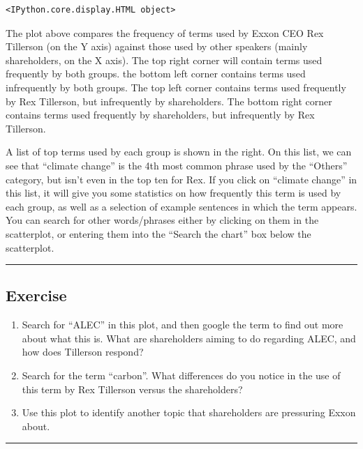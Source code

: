 \documentclass[
  letterpaper,
  DIV=11,
  numbers=noendperiod]{scrreprt}
\begin{document}
\begin{verbatim}
<IPython.core.display.HTML object>
\end{verbatim}

The plot above compares the frequency of terms used by Exxon CEO Rex
Tillerson (on the Y axis) against those used by other speakers (mainly
shareholders, on the X axis). The top right corner will contain terms
used frequently by both groups. the bottom left corner contains terms
used infrequently by both groups. The top left corner contains terms
used frequently by Rex Tillerson, but infrequently by shareholders. The
bottom right corner contains terms used frequently by shareholders, but
infrequently by Rex Tillerson.

A list of top terms used by each group is shown in the right. On this
list, we can see that ``climate change'' is the 4th most common phrase
used by the ``Others'' category, but isn't even in the top ten for Rex.
If you click on ``climate change'' in this list, it will give you some
statistics on how frequently this term is used by each group, as well as
a selection of example sentences in which the term appears. You can
search for other words/phrases either by clicking on them in the
scatterplot, or entering them into the ``Search the chart'' box below
the scatterplot.

\begin{center}\rule{0.5\linewidth}{0.5pt}\end{center}

\hypertarget{exercise-10}{%
\subsection{Exercise}\label{exercise-10}}

\begin{enumerate}
\def\labelenumi{\arabic{enumi}.}
\item
  Search for ``ALEC'' in this plot, and then google the term to find out
  more about what this is. What are shareholders aiming to do regarding
  ALEC, and how does Tillerson respond?
\item
  Search for the term ``carbon''. What differences do you notice in the
  use of this term by Rex Tillerson versus the shareholders?
\item
  Use this plot to identify another topic that shareholders are
  pressuring Exxon about.
\end{enumerate}

\begin{center}\rule{0.5\linewidth}{0.5pt}\end{center}
\end{document}

